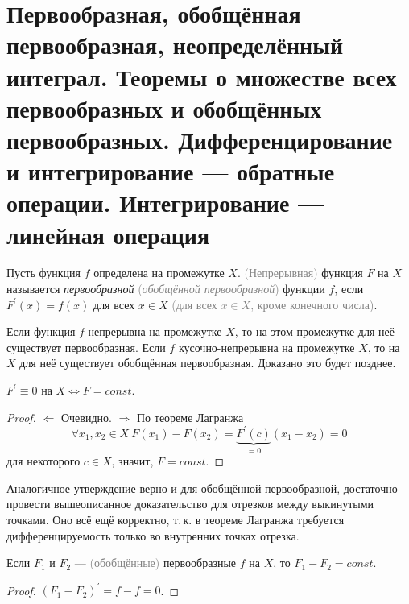\section{Первообразная, обобщённая первообразная, неопределённый интеграл. Теоремы о множестве всех первообразных и обобщённых первообразных. Дифференцирование и интегрирование --- обратные операции. Интегрирование --- линейная операция}

\begin{definition}
    Пусть функция $f$ определена на промежутке $X$. \textcolor{gray}{(Непрерывная)} функция $F$ на $X$ называется \textit{первообразной} \textcolor{gray}{(\textit{обобщённой первообразной})} функции $f$, если $F^\prime(x) = f(x)$ для всех $x \in X$ \textcolor{gray}{(для всех $x \in X$, кроме конечного числа)}.
\end{definition}

\begin{remark}
    Если функция $f$ непрерывна на промежутке $X$, то на этом промежутке для неё существует первообразная. Если $f$ кусочно-непрерывна на промежутке $X$, то на $X$ для неё существует обобщённая первообразная. Доказано это будет позднее.
\end{remark}

\begin{statement}
    $F^\prime \equiv 0$ на $X \iff F = const$.
\end{statement}

\begin{proof}
    $\Leftarrow$ Очевидно. $\Rightarrow$ По теореме Лагранжа \[\forall x_1, x_2 \in X\ F(x_1) - F(x_2) = \underbrace{F^\prime(c)}_{{} = 0}(x_1 - x_2) = 0\] для некоторого $c \in X$, значит, $F = const$.
\end{proof}

Аналогичное утверждение верно и для обобщённой первообразной, достаточно провести вышеописанное доказательство для отрезков между выкинутыми точками. Оно всё ещё корректно, т.\,к. в теореме Лагранжа требуется дифференцируемость только во внутренних точках отрезка.

\begin{theorem}
    Если $F_1$ и $F_2$ --- \textcolor{gray}{(обобщённые)} первообразные $f$ на $X$, то $F_1 - F_2 = const$.
\end{theorem}

\begin{proof}
    $(F_1 - F_2)^\prime = f - f = 0$.
\end{proof}

